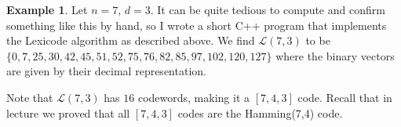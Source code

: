 \documentclass{article}
\theoremstyle{plain}
\theoremstyle{definition}
\newtheorem{exmp}[theorem]{Example}
\begin{document}
\begin{exmp}
Let $n=7$, $d=3$.  It can be quite tedious to compute and confirm something like this by hand, so I wrote a short C++ program that implements the Lexicode algorithm as described above.  We find $\mathcal{L}(7,3)$ to be $\{0,7,25,30,42,45,51,52,75,76,82,85,97,102,120,127\}$ where the binary vectors are given by their decimal representation.
\end{exmp}

Note that $\mathcal{L}(7,3)$ has $16$ codewords, making it a $[7,4,3]$ code.  Recall that in lecture we proved that all $[7,4,3]$ codes are the Hamming(7,4) code.  
\end{document}
